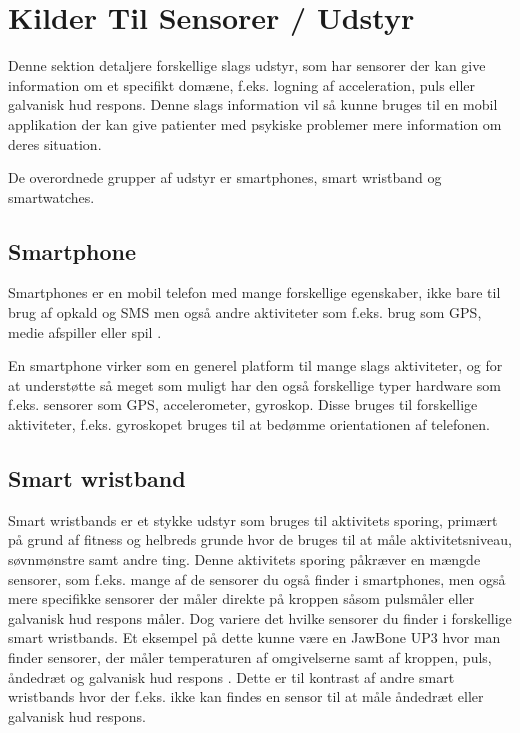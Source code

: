 \section{Kilder Til Sensorer / Udstyr}\label{sec:kilder-til-sensorer}
Denne sektion detaljere forskellige slags udstyr, som har sensorer der kan give information om et specifikt domæne, f.eks. logning af acceleration, puls eller galvanisk hud respons.
Denne slags information vil så kunne bruges til en mobil applikation der kan give patienter med psykiske problemer mere information om deres situation.

De overordnede grupper af udstyr er smartphones, smart wristband og smartwatches. 

\subsection{Smartphone}
Smartphones er en mobil telefon med mange forskellige egenskaber, ikke bare til brug af opkald og SMS men også andre aktiviteter som f.eks. brug som GPS, medie afspiller eller spil \citep{misc:smartphone}.

En smartphone virker som en generel platform til mange slags aktiviteter, og for at understøtte så meget som muligt har den også forskellige typer hardware som f.eks. sensorer som GPS, accelerometer, gyroskop. Disse bruges til forskellige aktiviteter, f.eks. gyroskopet bruges til at bedømme orientationen af telefonen. 

\subsection{Smart wristband} %
Smart wristbands er et stykke udstyr som bruges til aktivitets sporing, primært på grund af fitness og helbreds grunde hvor de bruges til at måle aktivitetsniveau, søvnmønstre samt andre ting.
Denne aktivitets sporing påkræver en mængde sensorer, som f.eks. mange af de sensorer du også finder i smartphones, men også mere specifikke sensorer der måler direkte på kroppen såsom pulsmåler eller galvanisk hud respons måler. 
Dog variere det hvilke sensorer du finder i forskellige smart wristbands.
Et eksempel på dette kunne være en JawBone UP3 hvor man finder sensorer, der måler temperaturen af omgivelserne samt af kroppen, puls, åndedræt og galvanisk hud respons \citep{misc:jawboneup3sensors}. 
Dette er til kontrast af andre smart wristbands hvor der f.eks. ikke kan findes en sensor til at måle åndedræt eller galvanisk hud respons.

